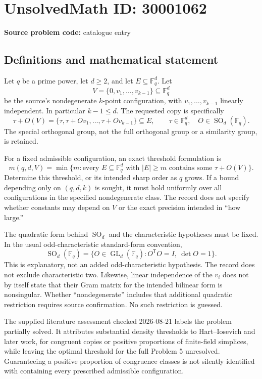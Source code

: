 \documentclass[11pt]{article}
\newcommand{\F}{\mathbb{F}}
\begin{document}
\section*{UnsolvedMath ID: 30001062}
\textbf{Source problem code:} catalogue entry
\subsection{Definitions and mathematical statement}
Let $q$ be a prime power, let $d\geq2$, and let $E\subseteq\F_q^d$. Let
\[
V=\{0,v_1,\ldots,v_{k-1}\}\subseteq\F_q^d
\]
be the source's nondegenerate $k$-point configuration, with $v_1,\ldots,v_{k-1}$ linearly independent. In particular $k-1\leq d$. The requested copy is specifically
\[
\tau+O(V)=\{\tau,\tau+Ov_1,\ldots,\tau+Ov_{k-1}\}\subseteq E,
\qquad \tau\in\F_q^d,\quad O\in\operatorname{SO}_d(\F_q).
\]
The special orthogonal group, not the full orthogonal group or a similarity group, is retained.

For a fixed admissible configuration, an exact threshold formulation is
\[
m(q,d,V)=\min\{m:\text{every }E\subseteq\F_q^d\text{ with }|E|\geq m
\text{ contains some }\tau+O(V)\}.
\]
Determine this threshold, or its intended sharp order as $q$ grows. If a bound depending only on $(q,d,k)$ is sought, it must hold uniformly over all configurations in the specified nondegenerate class. The record does not specify whether constants may depend on $V$ or the exact precision intended in ``how large.''

The quadratic form behind $\operatorname{SO}_d$ and the characteristic hypotheses must be fixed. In the usual odd-characteristic standard-form convention,
\[
\operatorname{SO}_d(\F_q)=\{O\in\operatorname{GL}_d(\F_q):O^{\mathsf T}O=I,\ \det O=1\}.
\]
This is explanatory, not an added odd-characteristic hypothesis. The record does not exclude characteristic two. Likewise, linear independence of the $v_i$ does not by itself state that their Gram matrix for the intended bilinear form is nonsingular. Whether ``nondegenerate'' includes that additional quadratic restriction requires source confirmation. No such restriction is guessed.

The supplied literature assessment checked 2026-08-21 labels the problem partially solved. It attributes substantial density thresholds to Hart--Iosevich and later work, for congruent copies or positive proportions of finite-field simplices, while leaving the optimal threshold for the full Problem 5 unresolved. Guaranteeing a positive proportion of congruence classes is not silently identified with containing every prescribed admissible configuration.
\end{document}
